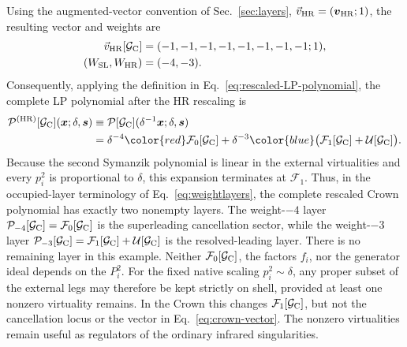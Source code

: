 \documentclass[a4paper,11pt]{article}
\newcommand{\x}{\boldsymbol{x}}
\newcommand{\s}{\boldsymbol{s}}
\newcommand{\HR}{\mathrm{HR}}
\newcommand{\WSL}{W_{\rm SL}}
\newcommand{\WHR}{W_{\rm HR}}
\newcommand{\vHR}{\vec v_{\rm HR}}
\newcommand{\SLcolour}[1]{{\color{red}#1}}
\newcommand{\HRcolour}[1]{{\color{blue}#1}}
\begin{document}
Using the augmented-vector convention of Sec.~\ref{sec:layers},
\(\vHR=(\boldsymbol v_{\HR};1)\), the resulting vector and weights are
\begin{equation}
\begin{aligned}
 \vHR[\mathcal G_{\rm C}]&=(-1,-1,-1,-1,-1,-1,-1,-1;1),\\
 (\WSL,\WHR)&=(-4,-3).
\end{aligned}
 \label{eq:crown-vector}
\end{equation}
Consequently, applying the definition in
Eq.~\eqref{eq:rescaled-LP-polynomial}, the complete LP polynomial after the HR
rescaling is
\begin{equation}
\begin{aligned}
 \mathcal P^{(\HR)}[\mathcal G_{\rm C}](\x;\delta,\s)
 &\equiv
 \mathcal P[\mathcal G_{\rm C}](\delta^{-1}\x;\delta,\s)\\
 &=\delta^{-4}\SLcolour{\mathcal F_0[\mathcal G_{\rm C}]}
  +\delta^{-3}\HRcolour{\bigl(\mathcal F_1[\mathcal G_{\rm C}]
                              +\mathcal U[\mathcal G_{\rm C}]\bigr)}.
\end{aligned}
 \label{eq:crown-colours}
\end{equation}
Because the second Symanzik polynomial is linear in the external virtualities
and every \(p_i^2\) is proportional to \(\delta\), this expansion terminates
at \(\mathcal F_1\).  Thus, in the occupied-layer terminology of
Eq.~\eqref{eq:weightlayers}, the complete rescaled Crown polynomial has
exactly two nonempty layers.  The weight-\(-4\) layer
\(\mathcal P_{-4}[\mathcal G_{\rm C}]=\mathcal F_0[\mathcal G_{\rm C}]\)
is the superleading cancellation sector, while the weight-\(-3\) layer
\(\mathcal P_{-3}[\mathcal G_{\rm C}]
=\mathcal F_1[\mathcal G_{\rm C}]+\mathcal U[\mathcal G_{\rm C}]\) is the
resolved-leading layer.  There is no remaining layer in this example.
Neither \(\mathcal F_0[\mathcal G_{\rm C}]\), the factors \(f_i\), nor the
generator ideal depends on the \(P_i^2\).  For the fixed native scaling
\(p_i^2\sim\delta\), any proper subset of the external legs may therefore be
kept strictly on shell, provided at least one nonzero virtuality remains.  In
the Crown this changes \(\mathcal F_1[\mathcal G_{\rm C}]\), but not the
cancellation locus or the vector in Eq.~\eqref{eq:crown-vector}.  The nonzero
virtualities remain useful as regulators of the ordinary infrared
singularities.
\end{document}
